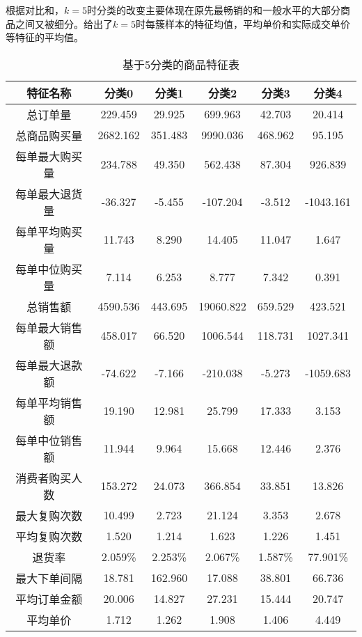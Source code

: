 \documentclass[lang=cn,11pt,a4paper,cite=authoryear]{elegantpaper}
\begin{document}
根据对比和，$k=5$时分类的改变主要体现在原先最畅销的和一般水平的大部分商品之间又被细分。给出了$k=5$时每簇样本的特征均值，平均单价和实际成交单价等特征的平均值。
\begin{center}
\begin{longtable}{c|c|c|c|c|c}
  \caption{基于5分类的商品特征表}
  \label{基于5分类的商品特征表}\\
    \hline
    \textbf{特征名称} & \textbf{分类0} & \textbf{分类1} & \textbf{分类2} & \textbf{分类3} & \textbf{分类4} \\
    \hline
    总订单量 & 229.459 & 29.925 & 699.963 & 42.703 & 20.414\\
    总商品购买量 & 2682.162 & 351.483 & 9990.036 & 468.962 & 95.195\\
    每单最大购买量 & 234.788 & 49.350 & 562.438 & 87.304 & 926.839\\
    每单最大退货量 & -36.327 & -5.455 & -107.204 & -3.512 & -1043.161\\
    每单平均购买量 & 11.743 & 8.290 & 14.405 & 11.047 & 1.647\\
    每单中位购买量 & 7.114  & 6.253 & 8.777 & 7.342 & 0.391\\
    总销售额 & 4590.536 & 443.695 & 19060.822 & 659.529 & 423.521\\
    每单最大销售额 & 458.017 & 66.520 & 1006.544 & 118.731 & 1027.341\\
    每单最大退款额 & -74.622 & -7.166 & -210.038 & -5.273 & -1059.683\\
    每单平均销售额 & 19.190 & 12.981 & 25.799 & 17.333 & 3.153\\
    每单中位销售额 & 11.944 & 9.964 & 15.668 & 12.446 & 2.376\\
    消费者购买人数 & 153.272 & 24.073 & 366.854 & 33.851 & 13.826\\
    最大复购次数 & 10.499 & 2.723 & 21.124 & 3.353 & 2.678\\
    平均复购次数 & 1.520 & 1.214 & 1.623 & 1.226 & 1.451\\
    退货率 & 2.059\% & 2.253\% & 2.067\% & 1.587\% & 77.901\%\\
    最大下单间隔 & 18.781 & 162.960 & 17.088 & 38.801 & 66.736\\
    平均订单金额 & 20.006 & 14.827 & 27.231 & 15.444 & 20.747\\
    平均单价 & 1.712 & 1.262 & 1.908 & 1.406 & 4.449\\
    \hline
\end{longtable}
\end{center}
\end{document}
